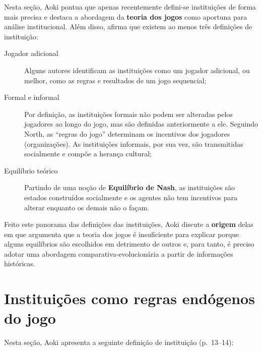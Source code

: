 \documentclass[9pt,twocolumn,twoside,lineno]{style}
\begin{document}
Nesta seção, Aoki pontua que apenas recentemente defini-se instituições de forma mais precisa e destaca a abordagem da \textbf{teoria dos jogos} como aportuna para análise institucional. Além disso, afirma que existem ao menos três definições de instituição:

\begin{description}
	\item[Jogador adicional] Alguns autores identificam as instituições como um jogador adicional, ou melhor, como as regras e resultados de um jogo sequencial;
	\item[Formal e informal] Por definição, as instituições formais não podem ser alteradas pelos jogadores ao longo do jogo, mas são definidas anteriormente a ele. Seguindo North, as ``regras do jogo'' determinam os incentivos dos jogadores (organizações). As instituições informais, por sua vez, são transmitidas socialmente e compõe a herança cultural;
	\item[Equilíbrio teórico] Partindo de uma noção de \textbf{Equilíbrio de Nash}, as instituições são estados construídos socialmente e os agentes não tem incentivos para alterar enquanto os demais não o façam.
\end{description}
Feito este panorama das definições das instituições, Aoki discute a \textbf{origem} delas em que argumenta que a teoria dos jogos é insuficiente para explicar porque alguns equilíbrios são escolhidos em detrimento de outros e, para tanto, é preciso adotar uma abordagem comparativa-evolucionária a partir de informações históricas.

\section{Instituições como regras endógenos do jogo}

Nesta seção, Aoki apresenta a seguinte definição de instituição (p.~13--14):
\end{document}
